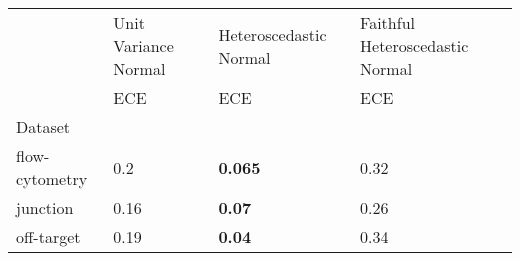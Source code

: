\begin{tabular}{l|l|l|l}
\toprule
 & Unit Variance Normal & Heteroscedastic Normal & Faithful Heteroscedastic Normal \\
 & ECE & ECE & ECE \\
Dataset &  &  &  \\
\midrule
flow-cytometry & 0.2 & \bfseries 0.065 & 0.32 \\
junction & 0.16 & \bfseries 0.07 & 0.26 \\
off-target & 0.19 & \bfseries 0.04 & 0.34 \\
\bottomrule
\end{tabular}
